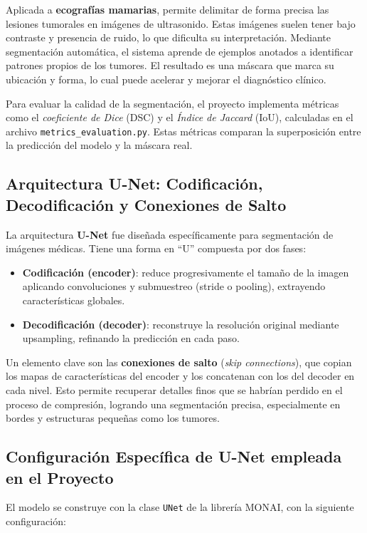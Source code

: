 \documentclass[12pt]{article}
\begin{document}
Aplicada a \textbf{ecografías mamarias}, permite delimitar de forma precisa las lesiones tumorales en imágenes de ultrasonido. Estas imágenes suelen tener bajo contraste y presencia de ruido, lo que dificulta su interpretación. Mediante segmentación automática, el sistema aprende de ejemplos anotados a identificar patrones propios de los tumores. El resultado es una máscara que marca su ubicación y forma, lo cual puede acelerar y mejorar el diagnóstico clínico.

Para evaluar la calidad de la segmentación, el proyecto implementa métricas como el \textit{coeficiente de Dice} (DSC) y el \textit{Índice de Jaccard} (IoU), calculadas en el archivo \texttt{metrics\_evaluation.py}. Estas métricas comparan la superposición entre la predicción del modelo y la máscara real.

\subsection*{Arquitectura U-Net: Codificación, Decodificación y Conexiones de Salto}  
La arquitectura \textbf{U-Net} fue diseñada específicamente para segmentación de imágenes médicas. Tiene una forma en “U” compuesta por dos fases:

\begin{itemize}
  \item \textbf{Codificación (encoder)}: reduce progresivamente el tamaño de la imagen aplicando convoluciones y submuestreo (stride o pooling), extrayendo características globales.
  \item \textbf{Decodificación (decoder)}: reconstruye la resolución original mediante upsampling, refinando la predicción en cada paso.
\end{itemize}

Un elemento clave son las \textbf{conexiones de salto} (\textit{skip connections}), que copian los mapas de características del encoder y los concatenan con los del decoder en cada nivel. Esto permite recuperar detalles finos que se habrían perdido en el proceso de compresión, logrando una segmentación precisa, especialmente en bordes y estructuras pequeñas como los tumores.

\subsection*{Configuración Específica de U-Net empleada en el Proyecto}
El modelo se construye con la clase \texttt{UNet} de la librería MONAI, con la siguiente configuración:
\end{document}
